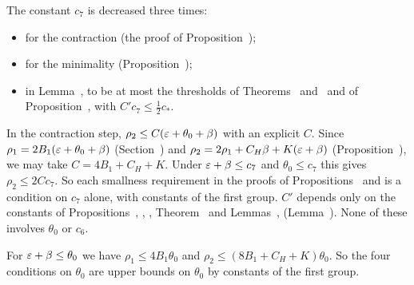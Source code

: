 \begin{detail}
\begin{step}
The constant $c_7$ is decreased three times:
\begin{itemize}
\item for the contraction (the proof of Proposition~);
\item for the minimality (Proposition~);
\item in Lemma~, to be at most the thresholds of Theorems~ and~ and of Proposition~, with $C'c_7\le\frac12c_*$.
\end{itemize}
In the contraction step, $\rho_2\le C(\varepsilon+\theta_0+\beta)$ with an explicit $C$. Since $\rho_1=2B_1(\varepsilon+\theta_0+\beta)$ (Section~) and $\rho_2=2\rho_1+C_H\beta+K(\varepsilon+\beta)$ (Proposition~), we may take $C=4B_1+C_H+K$. Under $\varepsilon+\beta\le c_7$ and $\theta_0\le c_7$ this gives $\rho_2\le2Cc_7$. So each smallness requirement in the proofs of Propositions~ and  is a condition on $c_7$ alone, with constants of the first group. $C'$ depends only on the constants of Propositions~, , , Theorem~ and Lemmas~,  (Lemma~). None of these involves $\theta_0$ or $c_6$.
\end{step}

\begin{step}\label{det:ledger-c6c7-theta}
For $\varepsilon+\beta\le\theta_0$ we have $\rho_1\le4B_1\theta_0$ and $\rho_2\le(8B_1+C_H+K)\theta_0$. So the four conditions on $\theta_0$ are upper bounds on $\theta_0$ by constants of the first group.
\end{step}


\end{detail}
